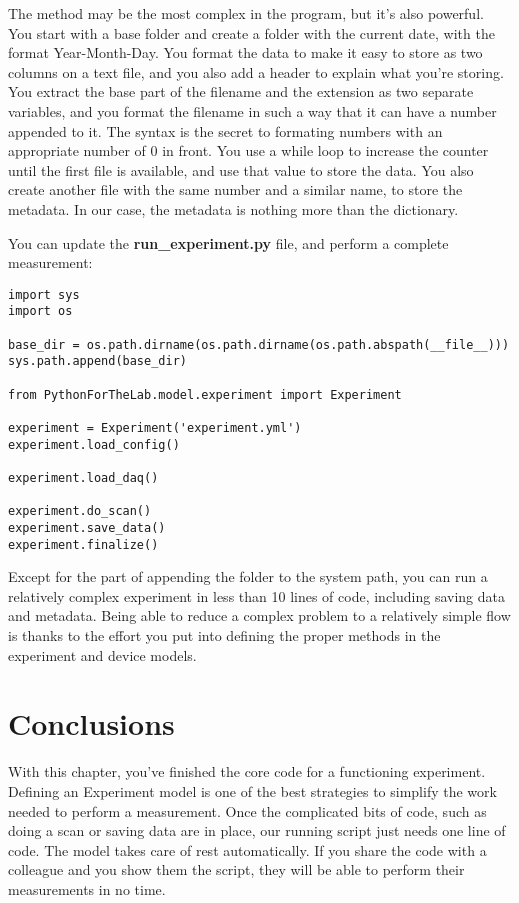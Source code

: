 The  method may be the most complex in the program, but it's also powerful. You start with a base folder and create a folder with the current date, with the format Year-Month-Day. You format the data to make it easy to store as two columns on a text file, and you also add a header to explain what you're storing. You extract the base part of the filename and the extension as two separate variables, and you format the filename in such a way that it can have a number appended to it. The syntax  is the secret to formating numbers with an appropriate number of $0$ in front. You use a while loop to increase the counter until the first file is available, and use that value to store the data. You also create another file with the same number and a similar name, to store the metadata. In our case, the metadata is nothing more than the  dictionary.


You can update the \textbf{run\_experiment.py} file, and perform a complete measurement:

\begin{verbatim}
import sys
import os

base_dir = os.path.dirname(os.path.dirname(os.path.abspath(__file__)))
sys.path.append(base_dir)

from PythonForTheLab.model.experiment import Experiment

experiment = Experiment('experiment.yml')
experiment.load_config()

experiment.load_daq()

experiment.do_scan()
experiment.save_data()
experiment.finalize()
\end{verbatim}

Except for the part of appending the folder to the system path, you can run a relatively complex experiment in less than 10 lines of code, including saving data and metadata. Being able to reduce a complex problem to a relatively simple flow is thanks to the effort you put into defining the proper methods in the experiment and device models.

\section{Conclusions}\label{sec:experiment-model-conclusions}
With this chapter, you've finished the core code for a functioning experiment. Defining an Experiment model is one of the best strategies to simplify the work needed to perform a measurement. Once the complicated bits of code, such as doing a scan or saving data are in place, our running script just needs one line of code. The model takes care of rest automatically. If you share the code with a colleague and you show them the  script, they will be able to perform their measurements in no time.

